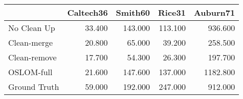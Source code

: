 \begin{tabular}{lrrrr}
\toprule
{} & Caltech36 & Smith60 &  Rice31 & Auburn71 \\
\midrule
No Clean Up  &    33.400 & 143.000 & 113.100 &  936.600 \\
Clean-merge  &    20.800 &  65.000 &  39.200 &  258.500 \\
Clean-remove &    17.700 &  54.300 &  26.300 &  197.700 \\
OSLOM-full   &    21.600 & 147.600 & 137.000 & 1182.800 \\
Ground Truth &    59.000 & 192.000 & 247.000 &  912.000 \\
\bottomrule
\end{tabular}
